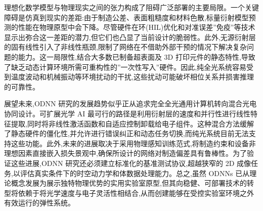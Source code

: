 \documentclass[11pt]{article}
\begin{document}
理想化数学模型与物理现实之间的张力构成了阻碍广泛部署的主要局限。一个关键障碍是仿真到现实的差距:由于制造公差、表面粗糙度和材料色散,标量衍射模型预测的性能在物理原型中会下降。尽管硬件在环(HIL)优化和对准误差''免疫''等技术显示出弥合这一差距的潜力,但它们也凸显了当前设计的脆弱性。此外,无源衍射层的固有线性引入了非线性瓶颈,限制了网络在不借助外部干预的情况下解决复杂问题的能力。这一局限性,结合大多数已制备超表面及 3D 打印元件的静态特性,导致了缺乏动态计算环境所需可重构性的''一次性写入''硬件。因此,纯全光系统容易受到温度波动和机械振动等环境扰动的干扰,这些扰动可能破坏相位关系并损害推理的可靠性。

展望未来,ODNN 研究的发展趋势似乎正从追求完全全光通用计算机转向混合光电协同设计。可扩展光学 AI 最可行的路径是利用衍射层的速度和并行性进行线性特征提取,同时将非线性激活函数和自适应控制卸载给电子组件。这种混合方法缓解了静态硬件的僵化性,并允许进行错误纠正和动态任务切换,而纯光系统目前无法支持这些功能。此外,未来的进展取决于采用物理感知训练范式,将制造约束和设备非理想因素直接嵌入损失景观中,确保所设计的网络对制造偏差具有鲁棒性。为了验证这些进展,ODNN 研究还必须建立标准化的基准测试协议,超越狭窄的 2D 成像任务,以评估真实条件下的时空动力学和体数据处理能力。总之,虽然 ODNNs 已从理论概念发展为展示独特物理优势的实用实验室原型,但其向稳健、可部署技术的转型将依赖于将光学速度与电子灵活性相结合,从而创建能够在受控实验室环境之外有效运行的弹性系统。



\end{document}

